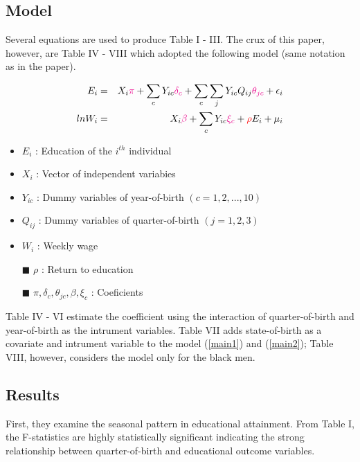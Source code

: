 \documentclass{article}
\begin{document}
\subsection{Model}

Several equations are used to produce Table I - III. The crux of this paper, however, are Table IV - VIII which adopted the following model (same notation as in the paper).

\begin{eqnarray}
 \label{main1}
  E_i &=& X_i \textcolor{magenta}{\pi} + \displaystyle\sum_{c} Y_{ic} \textcolor{magenta}{\delta _c} + \displaystyle\sum_{c} \displaystyle\sum_{j} Y_{ic}Q_{ij}\textcolor{magenta}{\theta _{jc}}+ \epsilon_i \\
  \label{main2}
  ln W_i &=&  X_i \textcolor{magenta}{\beta} + \displaystyle\sum_{c} Y_{ic}\textcolor{magenta}{\xi _c} + \textcolor{red}{\rho} E_i + \mu _i 
\end{eqnarray}

\begin{itemize}
\item $E_i$ : Education of the $i^{th}$ individual 
\item $X_i$ : Vector of independent variabies 
\item $Y_{ic}$ : Dummy variables of year-of-birth $(c=1, 2,..., 10)$
\item $Q_{ij}$ : Dummy variables of quarter-of-birth $(j=1, 2, 3)$
\item $W_i$ : Weekly wage
\item[$\blacksquare$] $\rho$ : Return to education
\item[$\blacksquare$] $\pi, \delta _c, \theta _{jc}, \beta, \xi _c$ : Coeficients
\end{itemize}

Table IV - VI estimate the coefficient using the interaction of quarter-of-birth and year-of-birth as the intrument variables.
Table VII adds state-of-birth as a covariate and intrument variable to the model (\ref{main1}) and (\ref{main2}); Table VIII, however, considers the model only for the black men.

\subsection{Results}
First, they examine the seasonal pattern in educational attainment. From Table I, the F-statistics are highly statistically significant indicating the strong relationship between quarter-of-birth and educational outcome variables.
\end{document}
